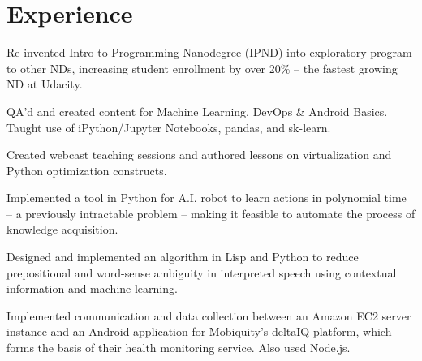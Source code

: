 \documentclass[]{deedy-resume-openfont}
\begin{document}
\hfill
\begin{minipage}[t]{0.66\textwidth} 


\section{Experience}

\vspace{\topsep} %
\begin{tightemize}

\item Re-invented Intro to Programming Nanodegree (IPND) into exploratory program to other NDs, increasing student enrollment by over 20\% -- the fastest growing ND at Udacity.

\item QA'd and created content for Machine Learning, DevOps \& Android Basics. Taught use of iPython/Jupyter Notebooks, pandas, and sk-learn.

\item Created webcast teaching sessions and authored lessons on virtualization and Python optimization constructs.

\end{tightemize}
\sectionsep

\begin{tightemize}
\item Implemented a tool in Python for A.I. robot to learn actions in polynomial time -- a previously intractable problem -- making it feasible to automate the process of knowledge acquisition.

\item Designed and implemented an algorithm in Lisp and Python to reduce prepositional and word-sense ambiguity in interpreted speech using contextual information and machine learning.
\end{tightemize}
\sectionsep

\begin{tightemize}
\item Implemented communication and data collection between an Amazon EC2 server instance and an Android application for Mobiquity’s deltaIQ platform, which forms the basis of their health monitoring service. Also used Node.js.


\end{tightemize}
\end{minipage}
\end{document}
